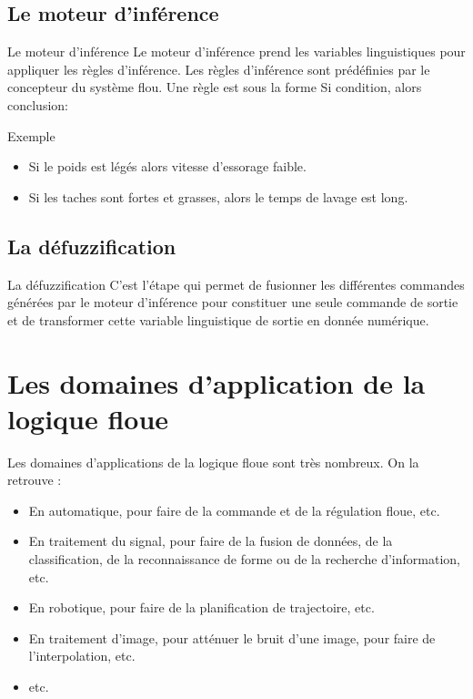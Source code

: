 \documentclass[aspectratio=169,professionalfonts, 12pt]{beamer}
\begin{document}
\subsection{Le moteur d'inférence}
\begin{frame}{Le moteur d'inférence}
  Le moteur d’inférence prend les variables linguistiques pour
  appliquer les règles d’inférence. Les règles d’inférence sont 
  prédéfinies par le concepteur du système flou. \newline
  Une règle est sous la forme Si condition, alors conclusion:
  \begin{block}{Exemple}
    \begin{itemize}
      \item Si le poids est légés alors vitesse d’essorage faible.
      \item Si les taches sont fortes et grasses, alors le temps de lavage est long.
    \end{itemize}
  \end{block}
\end{frame}
\subsection{La défuzzification}
\begin{frame}{La défuzzification}
  C’est l’étape qui permet de fusionner les différentes commandes générées par
  le moteur d'inférence pour constituer une seule commande de sortie et de
  transformer cette variable linguistique de sortie en donnée numérique.
\end{frame}
\section{Les domaines d’application de la logique floue}
\begin{frame}
  Les domaines d'applications de la logique floue sont très nombreux. On la retrouve :
  \begin{itemize}
    \item En automatique, pour faire de la commande et de la régulation floue, etc.
    \item En traitement du signal, pour faire de la fusion de données, de la classification, de la reconnaissance de forme ou de la recherche d'information, etc.
    \item En robotique, pour faire de la planification de trajectoire, etc.
    \item En traitement d'image, pour atténuer le bruit d'une image, pour faire de l’interpolation, etc.
    \item etc.
  \end{itemize}
\end{frame}
\end{document}
